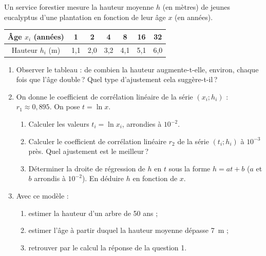       \begin{exo}
            \label{exo:stat9}
            Un service forestier mesure la hauteur moyenne $h$ (en m\`etres) de jeunes eucalyptus d'une plantation
            en fonction de leur \^age $x$ (en ann\'ees).
            \begin{center}
            \begin{tabular}{|c|c|c|c|c|c|c|}
                  \hline
                  \^Age $x_i$ (ann\'ees) & 1 & 2 & 4 & 8 & 16 & 32 \\
                  \hline
                  Hauteur $h_i$ (m) & 1,1 & 2,0 & 3,2 & 4,1 & 5,1 & 6,0 \\
                  \hline
            \end{tabular}
            \end{center}
            \begin{enumerate}
                  \item Observer le tableau : de combien la hauteur augmente-t-elle, environ, 
                        chaque fois que l'\^age double\,? Quel type d'ajustement cela sugg\`ere-t-il\,?
                  \item On donne le coefficient de corr\'elation lin\'eaire de la s\'erie $(x_i ; h_i)$ : $r_1 \approx 0,895$.
                        On pose $t = \ln x$.
                        \begin{enumerate}
                        \item Calculer les valeurs $t_i = \ln x_i$, arrondies \`a $10^{-2}$.
                        \item Calculer le coefficient de corr\'elation lin\'eaire $r_2$ de la s\'erie $(t_i ; h_i)$ \`a $10^{-3}$ pr\`es.
                              Quel ajustement est le meilleur\,?
                        \item D\'eterminer la droite de r\'egression de $h$ en $t$ sous la forme $h = a t + b$ 
                              ($a$ et $b$ arrondis \`a $10^{-2}$). En d\'eduire $h$ en fonction de $x$.
                        \end{enumerate}
                  \item Avec ce mod\`ele :
                        \begin{enumerate}
                        \item estimer la hauteur d'un arbre de 50 ans ;
                        \item estimer l'\^age \`a partir duquel la hauteur moyenne d\'epasse 7~m ;
                        \item retrouver par le calcul la r\'eponse de la question 1.
                        \end{enumerate}
            \end{enumerate}
      \end{exo}
